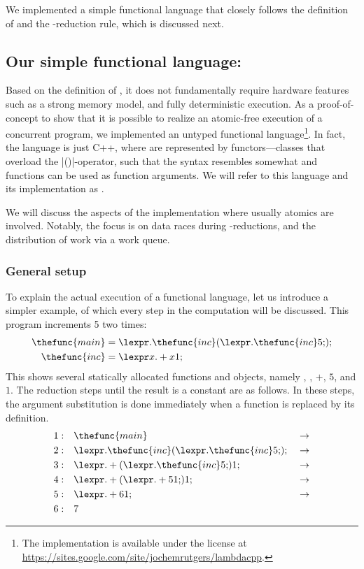 We implemented a simple functional language that closely follows the definition of \lcalc and the \fxbeta-reduction rule, which is discussed next.


\subsection{Our simple functional language: \Ourfp}

\label{s:concurrency:ourlang}

Based on the definition of \lcalc, it does not fundamentally require hardware features such as a strong memory model, and fully deterministic execution.
As a proof-of-concept to show that it is possible to realize an atomic-free execution of a concurrent program, we implemented an untyped functional language\footnote{%
	The implementation is available under the  license at \\
	\url{https://sites.google.com/site/jochemrutgers/lambdacpp}.}.
In fact, the language is just C++, where \lterms are represented by functors---classes that overload the \lsticode|()|-operator, such that the syntax resembles \lcalc somewhat and functions can be used as function arguments.
We will refer to this language and its implementation as \emph{\ourfp*}.

We will discuss the aspects of the implementation where usually atomics are involved.
Notably, the focus is on data races during \fxbeta-reductions, and the distribution of work via a work queue.

\subsubsection{General setup}

\label{s:concurrency:double_inc}
To explain the actual execution of a functional language, let us introduce a simpler example, of which every step in the computation will be discussed.
This program increments 5 two times:
\begin{align*}
\thefunc{main}	& = \lexpr.\thefunc{inc} ({\lexpr.\thefunc{inc} 5;});	\\	%
\thefunc{inc}	& = \lexpr x.+ x 1;											%
\end{align*}
This shows several statically allocated functions and objects, namely , , $+$, $5$, and $1$.
The reduction steps until the result is a constant are as follows.
In these steps, the argument substitution is done immediately when a function is replaced by its definition.
\begin{align*}
1:\quad & \thefunc{main}												& \lcred{}
2:\quad & \lexpr.\thefunc{inc} ({\lexpr.\thefunc{inc} 5;});				& \lcred{}
3:\quad & \lexpr.+ ({\lexpr.\thefunc{inc} 5;}) 1;						& \lcred{}
4:\quad & \lexpr.+ ({\lexpr.+ 5 1;}) 1;									& \lcred{}
5:\quad & \lexpr.+ 6 1;													& \lcred{}
6:\quad & 7																&
\end{align*}

